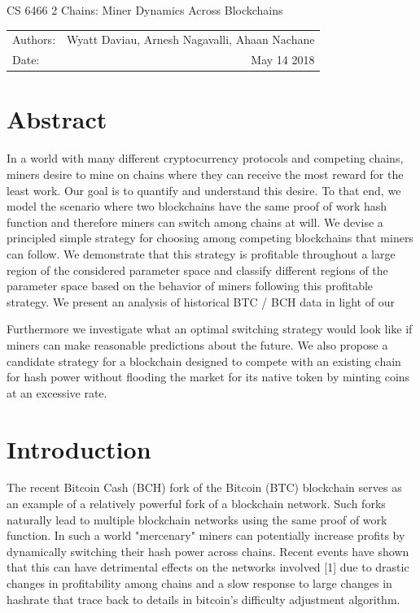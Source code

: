 \documentclass[10pt, preprint]{aastex}
\begin{document}
\begin{center}
{\Large CS 6466 2 Chains: Miner Dynamics Across Blockchains}


\begin{tabular}{lr}
Authors: & Wyatt Daviau, Arnesh Nagavalli, Ahaan Nachane \\
Date: & May 14 2018 \\
\end{tabular}
\end{center}


\section{Abstract}
In a world with many different cryptocurrency protocols and competing chains, miners desire to mine on chains where they can receive the most reward for the least work. Our goal is to quantify and understand this desire. To that end, we model the scenario where two blockchains have the same proof of work hash function and therefore miners can switch among chains at will.  We devise a principled simple strategy for choosing among competing blockchains that miners can follow.  We demonstrate that this strategy is profitable throughout a large region of the considered parameter space and classify different regions of the parameter space based on the behavior of miners following this profitable strategy.  We present an analysis of historical BTC / BCH data in light of our 

Furthermore we investigate what an optimal switching strategy would look like if miners can make reasonable predictions about the future.  We also propose a candidate strategy for a blockchain designed to compete with an existing chain for hash power without flooding the market for its native token by minting coins at an excessive rate.

\section{Introduction}
The recent Bitcoin Cash (BCH) fork of the Bitcoin (BTC) blockchain serves as an example of a relatively powerful fork of a blockchain network.  Such forks naturally lead to multiple blockchain networks using the same proof of work function.  In such a world "mercenary" miners can potentially increase profits by dynamically switching their hash power across chains.  Recent events have shown that this can have detrimental effects on the networks involved [1] due to drastic changes in profitability among chains and a slow response to large changes in hashrate that trace back to details in bitcoin's difficulty adjustment algorithm.
\end{document}
